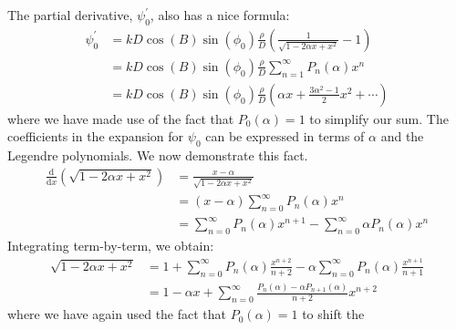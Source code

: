 \documentclass{article}
\theoremstyle{plain}
\begin{document}
        The partial derivative, $\psi^{\prime}_{0}$, also has a nice formula:
        \begin{subequations}
            \begin{align}
                \psi^{\prime}_{0}
                &=kD\cos(B)\sin(\phi_{0})\frac{\rho}{D}\left(
                    \frac{1}{\sqrt{1-2\alpha{x}+x^{2}}}-1
                \right)\\
                &=kD\cos(B)\sin(\phi_{0})\frac{\rho}{D}
                    \sum_{n=1}^{\infty}P_{n}(\alpha)x^{n}\\
                &=kD\cos(B)\sin(\phi_{0})\frac{\rho}{D}\left(
                    \alpha{x}
                    +\frac{3\alpha^{2}-1}{2}x^{2}
                    +\cdots
                \right)
            \end{align}
        \end{subequations}
        where we have made use of the fact that $P_{0}(\alpha)=1$ to simplify
        our sum. The coefficients in the expansion for $\psi_{0}$ can be
        expressed in terms of $\alpha$ and the Legendre polynomials.
        We now demonstrate this fact.
        \begin{subequations}
            \begin{align}
                \frac{\textrm{d}}{\textrm{d}x}\left(
                    \sqrt{1-2\alpha{x}+x^{2}}
                \right)
                &=\frac{x-\alpha}{\sqrt{1-2\alpha{x}+x^{2}}}\\
                &=(x-\alpha)\sum_{n=0}^{\infty}P_{n}(\alpha)x^{n}\\
                &=\sum_{n=0}^{\infty}P_{n}(\alpha)x^{n+1}
                    -\sum_{n=0}^{\infty}\alpha{P}_{n}(\alpha)x^{n}
            \end{align}
        \end{subequations}
        Integrating term-by-term, we obtain:
        \begin{subequations}
            \begin{align}
                \sqrt{1-2\alpha{x}+x^{2}}
                &=1+\sum_{n=0}^{\infty}P_{n}(\alpha)\frac{x^{n+2}}{n+2}
                    -\alpha\sum_{n=0}^{\infty}P_{n}(\alpha)\frac{x^{n+1}}{n+1}\\
                &=1-\alpha{x}+\sum_{n=0}^{\infty}
                    \frac{P_{n}(\alpha)-\alpha{P}_{n+1}(\alpha)}{n+2}x^{n+2}
            \end{align}
        \end{subequations}
        where we have again used the fact that $P_{0}(\alpha)=1$ to shift the
\end{document}

